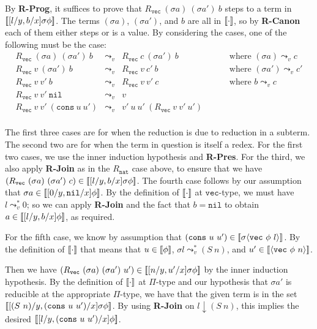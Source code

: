 \documentclass[copyright]{eptcs}
\newcommand{\vc}[0]{\texttt{vec}}
\newcommand{\nat}[0]{\texttt{nat}}
\newcommand{\nil}[0]{\texttt{nil}}
\newcommand{\cons}[0]{\texttt{cons}}
\newcommand{\leadstov}[0]{\leadsto_v}
\newcommand{\interp}[1]{[\negthinspace[#1]\negthinspace]}
\begin{document}
By \textbf{R-Prog}, it suffices to prove that $R_\vc\ (\sigma a)\
(\sigma a')\ b$ steps to a term in $\interp{[l/y,b/x]\sigma\phi}$.  The
terms $(\sigma a)$, $(\sigma a')$, and $b$ are all in  $\interp{\cdot}$, 
so by \textbf{R-Canon} each of them either steps or is a value. By
considering the cases, one of the following must be the case:
\[
\begin{array}{llll}
R_\vc\ (\sigma a)\ (\sigma a')\ b & \leadstov & R_\vc\ c\ (\sigma a')\ b &\qquad\text{ where }(\sigma a) \leadstov c \\
R_\vc\ v\ (\sigma a')\ b & \leadstov & R_\vc\ v\ c'\ b &\qquad\text{ where }(\sigma a') \leadstov c' \\
R_\vc\ v\ v'\ b & \leadstov & R_\vc\ v\ v'\ c &\qquad\text{ where } b \leadstov c \\
R_\vc\ v\ v'\ \nil & \leadstov & v \\
R_\vc\ v\ v'\ (\cons\ u\ u') & \leadstov & v'\ u\ u'\ (R_\vc\ v\  v'\  u')\\
\end{array}
\]


\noindent The first three cases are for when the reduction is due to
reduction in a subterm.  The second two are for when the term in
question is itself a redex.  For the first two cases, we use the inner
induction hypothesis and \textbf{R-Pres}.  For the third, we also
apply \textbf{R-Join} as in the $R_\nat$ case above, to ensure that we
have $(R_\vc\ (\sigma a)\ (\sigma a')\ c)\in\interp{[l/y,b/x]\sigma\phi}$.  The fourth
case follows by our assumption that $\sigma
a\in\interp{[0/y,\nil/x]\phi}$.  By the definition of
$\interp{\cdot}$ at $\vc$-type, we must have $l\leadstov^* 0$; so we can
apply \textbf{R-Join} and the fact that $b=\nil$ to obtain
$a\in\interp{[l/y,b/x]\phi}$, as required.

For the fifth case, we know by assumption that $(\cons\ u\ u') \in
\interp{\sigma\langle\vc\ \phi\ l\rangle}$.  By the definition of
$\interp{\cdot}$ that means that $u \in \interp{\phi}$, $\sigma l
\leadstov^* (S\ n)$, and $u' \in \interp{\langle\vc\ \phi\
n\rangle}$.

Then we have $(R_\vc\ (\sigma a)\ (\sigma a')\
u')\in\interp{[n/y,u'/x]\sigma\phi}$ by the inner induction
hypothesis. By the definition of $\interp{\cdot}$ at $\Pi$-type and
our hypothesis that $\sigma a'$ is reducible at the appropriate
$\Pi$-type, we have that the given term is in the set $\interp{[(S\
  n)/y, (\cons\ u\ u')/x]\sigma\phi}$. By using \textbf{R-Join} on
$l\downarrow(S\ n)$, this implies the desired $\interp{[l/y,(\cons\ u\
  u')/x]\phi}$.
\end{document}
